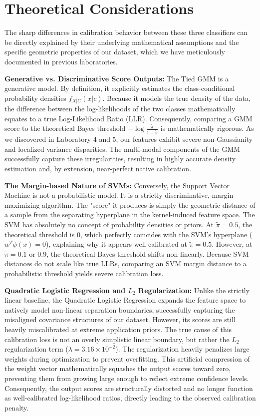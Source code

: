 \section{Theoretical Considerations}

The sharp differences in calibration behavior between these three classifiers can be directly explained by their underlying mathematical assumptions and the specific geometric properties of our dataset, which we have meticulously documented in previous laboratories.

\textbf{Generative vs. Discriminative Score Outputs:}
The Tied GMM is a generative model. By definition, it explicitly estimates the class-conditional probability densities $f_{X|C}(x|c)$. Because it models the true density of the data, the difference between the log-likelihoods of the two classes mathematically equates to a true Log-Likelihood Ratio (LLR). Consequently, comparing a GMM score to the theoretical Bayes threshold $-\log \frac{\tilde{\pi}}{1-\tilde{\pi}}$ is mathematically rigorous. As we discovered in Laboratory 4 and 5, our features exhibit severe non-Gaussianity and localized variance disparities. The multi-modal components of the GMM successfully capture these irregularities, resulting in highly accurate density estimation and, by extension, near-perfect native calibration.

\textbf{The Margin-based Nature of SVMs:}
Conversely, the Support Vector Machine is not a probabilistic model. It is a strictly discriminative, margin-maximizing algorithm. The "score" it produces is simply the geometric distance of a sample from the separating hyperplane in the kernel-induced feature space. The SVM has absolutely no concept of probability densities or priors. At $\tilde{\pi}=0.5$, the theoretical threshold is 0, which perfectly coincides with the SVM's hyperplane ($w^T \phi(x) = 0$), explaining why it appears well-calibrated at $\tilde{\pi}=0.5$. However, at $\tilde{\pi}=0.1$ or $0.9$, the theoretical Bayes threshold shifts non-linearly. Because SVM distances do not scale like true LLRs, comparing an SVM margin distance to a probabilistic threshold yields severe calibration loss.

\textbf{Quadratic Logistic Regression and $L_2$ Regularization:}
Unlike the strictly linear baseline, the Quadratic Logistic Regression expands the feature space to natively model non-linear separation boundaries, successfully capturing the misaligned covariance structures of our dataset. However, its scores are still heavily miscalibrated at extreme application priors. The true cause of this calibration loss is not an overly simplistic linear boundary, but rather the $L_2$ regularization term ($\lambda = 3.16 \times 10^{-2}$). The regularization heavily penalizes large weights during optimization to prevent overfitting. This artificial compression of the weight vector mathematically squashes the output scores toward zero, preventing them from growing large enough to reflect extreme confidence levels. Consequently, the output scores are structurally distorted and no longer function as well-calibrated log-likelihood ratios, directly leading to the observed calibration penalty.
